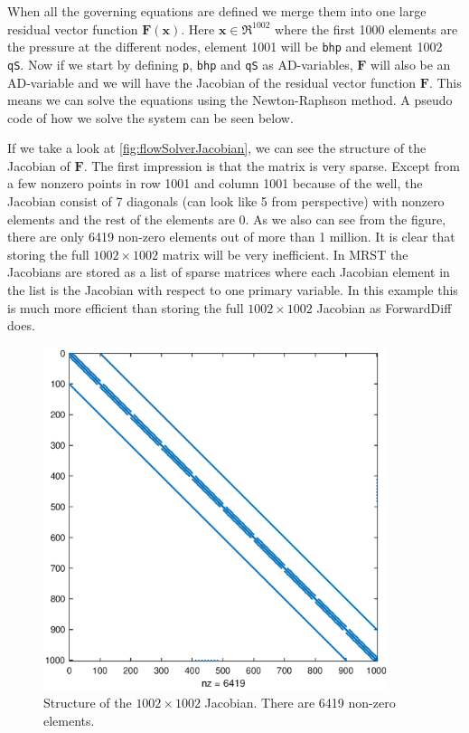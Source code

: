 When all the governing equations are defined we merge them into one large residual vector function $\boldsymbol{F}(\boldsymbol{x})$. Here $\boldsymbol{x}\in\Re^1002$ where the first 1000 elements are the pressure at the different nodes, element 1001 will be \texttt{bhp} and element 1002 \texttt{qS}. Now if we start by defining \texttt{p}, \texttt{bhp} and \texttt{qS} as AD-variables, $\boldsymbol{F}$ will also be an AD-variable and we will have the Jacobian of the residual vector function $\boldsymbol{F}$. This means we can solve the equations using the Newton-Raphson method. A pseudo code of how we solve the system can be seen below.



If we take a look at \autoref{fig:flowSolverJacobian}, we can see the structure of the Jacobian of $\boldsymbol{F}$. The first impression is that the matrix is very sparse. Except from a few nonzero points in row 1001 and column 1001 because of the well, the Jacobian consist of 7 diagonals (can look like 5 from perspective) with nonzero elements and the rest of the elements are 0. As we also can see from the figure, there are only 6419 non-zero elements out of more than 1 million. It is clear that storing the full $1002\times 1002$ matrix will be very inefficient. In MRST the Jacobians are stored as a list of sparse matrices where each Jacobian element in the list is the Jacobian with respect to one primary variable. In this example this is much more efficient than storing the full $1002\times 1002$ Jacobian as ForwardDiff does.

\begin{figure}[htbp]
    \centering
    \includegraphics[width = 0.9\textwidth]{figures/flowSolver_Jacobian.eps}
    \caption{Structure of the $1002\times 1002$ Jacobian. There are 6419 non-zero elements.}
    \label{fig:flowSolverJacobian}
\end{figure}